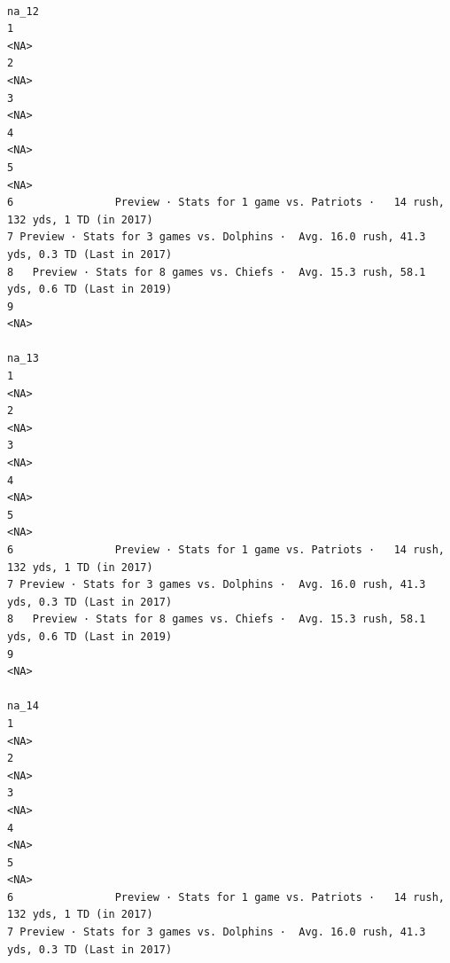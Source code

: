 \documentclass[
]{article}
\begin{document}
\begin{verbatim}
                                                                                        na_12
1                                                                                        <NA>
2                                                                                        <NA>
3                                                                                        <NA>
4                                                                                        <NA>
5                                                                                        <NA>
6                Preview · Stats for 1 game vs. Patriots ·   14 rush, 132 yds, 1 TD (in 2017)
7 Preview · Stats for 3 games vs. Dolphins ·  Avg. 16.0 rush, 41.3 yds, 0.3 TD (Last in 2017)
8   Preview · Stats for 8 games vs. Chiefs ·  Avg. 15.3 rush, 58.1 yds, 0.6 TD (Last in 2019)
9                                                                                        <NA>
                                                                                        na_13
1                                                                                        <NA>
2                                                                                        <NA>
3                                                                                        <NA>
4                                                                                        <NA>
5                                                                                        <NA>
6                Preview · Stats for 1 game vs. Patriots ·   14 rush, 132 yds, 1 TD (in 2017)
7 Preview · Stats for 3 games vs. Dolphins ·  Avg. 16.0 rush, 41.3 yds, 0.3 TD (Last in 2017)
8   Preview · Stats for 8 games vs. Chiefs ·  Avg. 15.3 rush, 58.1 yds, 0.6 TD (Last in 2019)
9                                                                                        <NA>
                                                                                        na_14
1                                                                                        <NA>
2                                                                                        <NA>
3                                                                                        <NA>
4                                                                                        <NA>
5                                                                                        <NA>
6                Preview · Stats for 1 game vs. Patriots ·   14 rush, 132 yds, 1 TD (in 2017)
7 Preview · Stats for 3 games vs. Dolphins ·  Avg. 16.0 rush, 41.3 yds, 0.3 TD (Last in 2017)

\end{verbatim}
\end{document}
